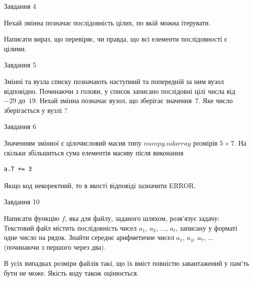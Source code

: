 \documentclass[12pt, ukrainian]{article}
\begin{document}
{\begin{minipage}[t]{8.0cm}
\end{minipage}


               
{\begin{center}Завдання {4}\end{center}}
\vspace{-4mm}
Нехай змінна  позначає послідовність цілих, по якій можна ітерувати.

Написати вираз, що перевіряє, чи правда, що всі елементи послідовності є цілими.\par

\vspace{10mm}
               
{\begin{center}Завдання {5}\end{center}}
\vspace{-4mm}
Змінні  та  вузла списку позначають наступний та попередній за ним вузол відповідно. Починаючи з голови, у список записано послідовні цілі числа від~$-29$ до~$19$. Нехай змінна  позначає вузол, що зберігає значення~$7$.
Яке число зберігається у вузлі  ?\par

               
{\begin{center}Завдання {6}\end{center}}
\vspace{-4mm}
Значенням змінної  є цілочисловий масив типу $numpy.ndarray$ розмірів $5{\times}7$. На скільки збільшиться сума елементів масиву  після виконання
\begin{verbatim}
a.T += 3
\end{verbatim}


Якщо код некоректний, то в якості відповіді зазначити ERROR.\par

               
{\begin{center}Завдання {10}\end{center}}
\vspace{-4mm}

Написати функцію $f$, яка для файлу, заданого шляхом, розв’язує задачу:\\ Текстовий файл містить послідовність чисел $a_1$, $a_2$, $\ldots$, $a_t$, записану у форматі одне число на рядок. Знайти середнє арифметичне чисел $a_1$, $a_4$, $a_7$, $\ldots$ (починаючи з першого через два).

В усіх випадках розміри файлів такі, що їх вміст повністю завантажений у пам'ть бути не може. Якість коду також оцінюється.



}
\end{document}
